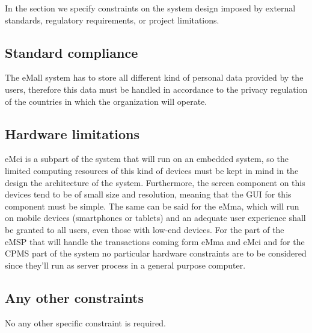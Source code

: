 In the section we specify constraints on the system design imposed by external standards, regulatory requirements, or project
limitations.

\subsection{Standard compliance}
The eMall system has to store all different kind of personal data provided by the users, therefore this data must be handled in accordance to the privacy regulation of the countries in which the organization will operate.

\subsection{Hardware limitations}
eMci is a subpart of the system that will run on an embedded system, so the limited computing resources of this kind of devices must be kept in mind in the design the architecture of the system. Furthermore, the screen component on this devices tend to be of small size and resolution, meaning that the GUI for this component must be simple. The same can be said for the eMma, which will run on mobile devices (smartphones or tablets) and an adequate user experience shall be granted to all users, even those with low-end devices. For the part of the eMSP that will handle the transactions coming form eMma and eMci and for the CPMS part of the system no particular hardware constraints are to be considered since they'll run as server process in a general purpose computer.

\subsection{Any other constraints}
No any other specific constraint is required.
